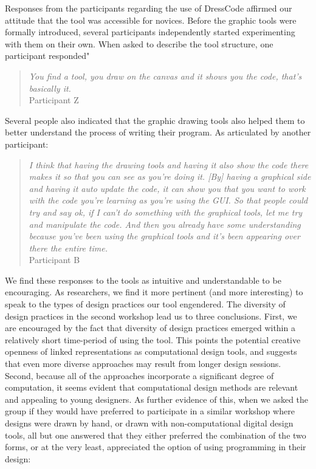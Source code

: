 \documentclass{sigchi}
\begin{document}
Responses from the participants regarding the use of DressCode affirmed our attitude that the tool was accessible for novices. Before the graphic tools were formally introduced, several participants independently started experimenting with them on their own. When asked to describe the tool structure, one participant responded"
\begin{quote}
\textit{You find a tool, you draw on the canvas and it shows you the code, that's basically it.}
\\Participant Z
\end{quote}\noindent
Several people also indicated that the graphic drawing tools also helped them to better understand the process of writing their program. As articulated by another participant:
\begin{quote}
\textit{I think that having the drawing tools and having it also show the code there makes it so that you can see as you're doing it. [By] having a graphical side and having it auto update the code, it can show you that you want to work with the code you're learning as you're using the GUI. So that people could try and say ok, if I can't do something with the graphical tools, let me try and manipulate the code. And then you already have some understanding because you've been using the graphical tools and it's been appearing over there the entire time.}
\\Participant B
\end{quote} 
We find these responses to the tools as intuitive and understandable to be encouraging. As researchers, we find it more pertinent (and more interesting) to speak to the types of design practices our tool engendered. The diversity of design practices in the second workshop lead us to three conclusions. First, we are encouraged by the fact that diversity of design practices emerged within a relatively short time-period of using the tool. This points the potential creative openness of linked representations as computational design tools, and suggests that even more diverse approaches may result from longer design sessions. Second, because all of the approaches incorporate a significant degree of computation, it seems evident that computational design methods are relevant and appealing to young designers. As further evidence of this, when we asked the group if they would have preferred to participate in a similar workshop where designs were drawn by hand, or drawn with non-computational digital design tools, all but one answered that they either preferred the combination of the two forms, or at the very least, appreciated the option of using programming in their design:
\end{document}
